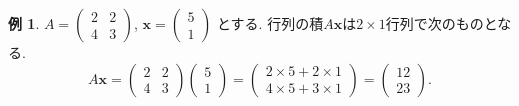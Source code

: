 \documentclass[dvipdfmx,a4paper,11pt]{article}
\theoremstyle{definition}
\newtheorem{exa}[thm]{例}
\begin{document}
  \begin{exa}
 $ A= 
 \begin{pmatrix}
2 & 2\\
4 & 3
 \end{pmatrix}
 $, $
\bm{x}= 
 \begin{pmatrix}
5 \\1
 \end{pmatrix}
 $
 とする. 
 行列の積$A\bm{x}$は$2 \times 1$行列で次のものとなる.  
 $$
 A\bm{x}= 
 \begin{pmatrix}
2 & 2\\
4 & 3
 \end{pmatrix}
  \begin{pmatrix}
5 \\1
 \end{pmatrix}
 =  
 \begin{pmatrix}
2\times 5 + 2\times 1 \\
4 \times 5 + 3 \times 1
 \end{pmatrix}
 = 
  \begin{pmatrix}
12 \\
23
 \end{pmatrix}.
 $$
 
 \end{exa}
 
\end{document}
